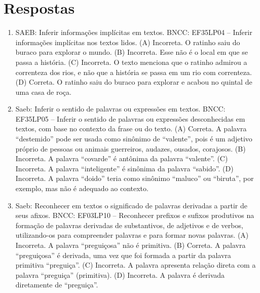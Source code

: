 \chapter{Respostas}
\pagestyle{plain}
\footnotesize

\pagecolor{gray!40}


\begin{enumerate}
\item
SAEB: Inferir informações implícitas em textos. BNCC: EF35LP04 -- Inferir informações implícitas nos textos lidos. (A) Incorreta. O ratinho saiu do buraco para explorar o mundo. (B) Incorreta. Esse não é o local em que se passa a história. (C) Incorreta. O texto menciona que o ratinho admirou a correnteza dos rios, e não que a história se passa em um rio com correnteza. (D) Correta. O ratinho saiu do buraco para explorar e acabou no quintal de uma casa de roça.

\item
Saeb: Inferir o sentido de palavras ou expressões em textos.
BNCC: EF35LP05 -- Inferir o sentido de palavras ou expressões
desconhecidas em textos, com base no contexto da frase ou do texto.
(A) Correta. A palavra ``destemido'' pode ser usada como sinônimo de
``valente'', pois é um adjetivo próprio de pessoas ou animais
guerreiros, audazes, ousados, corajosos.
(B) Incorreta. A palavra ``covarde'' é antônima da palavra ``valente''.
(C) Incorreta. A palavra ``inteligente'' é sinônima da palavra
``sabido''.
(D) Incorreta. A palavra ``doido'' teria como sinônimo ``maluco'' ou
``biruta'', por exemplo, mas não é adequado ao contexto.

\item
Saeb: Reconhecer em textos o significado de palavras derivadas a partir de seus afixos.
BNCC: EF03LP10 -- Reconhecer prefixos e sufixos produtivos na formação de
palavras derivadas de substantivos, de adjetivos e de verbos,
utilizando-os para compreender palavras e para formar novas palavras.
(A) Incorreta. A palavra ``preguiçosa'' não é primitiva.
(B) Correta. A palavra ``preguiçosa'' é derivada, uma vez que foi
formada a partir da palavra primitiva ``preguiça''.
(C) Incorreta. A palavra apresenta relação direta com a palavra
``preguiça'' (primitiva).
(D) Incorreta. A palavra é derivada diretamente de ``preguiça''.
\end{enumerate}


